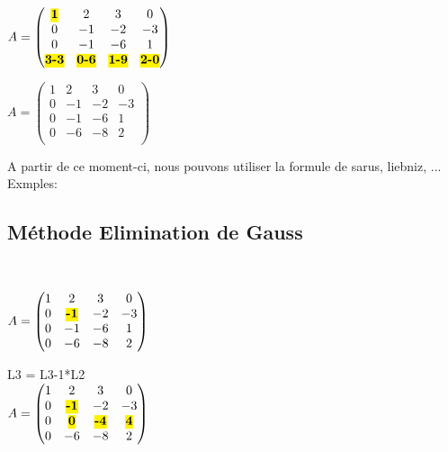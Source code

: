 \vspace{5mm} %

$
A =
\begin{pmatrix}
  \hl{\textbf{1}} & 2 & 3 & 0 \\
  0 & -1 & -2 & -3 \\
  0 & -1 & -6 & 1 \\
  \hl{\textbf{3-3}} & \hl{\textbf{0-6}} & \hl{\textbf{1-9}} & \hl{\textbf{2-0}} \\
\end{pmatrix}
$

\vspace{5mm} %

$
A =
\begin{pmatrix}
  1 & 2 & 3 & 0   \\
  0 & -1 & -2 & -3   \\
  0 & -1 & -6 & 1 \\
  0 & -6 & -8 & 2 \\
\end{pmatrix}
$

A partir de ce moment-ci, nous pouvons utiliser la formule de sarus, liebniz, ... \\
Exmples: \\

\subsection{Méthode Elimination de Gauss} \\

\vspace{5mm} %

$
A =
\begin{pmatrix}
  1 & 2 & 3 & 0   \\
  0 & \hl{\textbf{-1}} & -2 & -3   \\
  0 & -1 & -6 & 1 \\
  0 & -6 & -8 & 2 \\
\end{pmatrix}
$

\vspace{5mm} %

L3 = L3-1*L2 \\

$
A =
\begin{pmatrix}
  1 & 2 & 3 & 0    \\
  0 & \hl{\textbf{-1}} & -2 & -3 \\
  0 & \hl{\textbf{0}} & \hl{\textbf{-4}} & \hl{\textbf{4}}   \\
  0 & -6 & -8 & 2  \\
\end{pmatrix}
$

